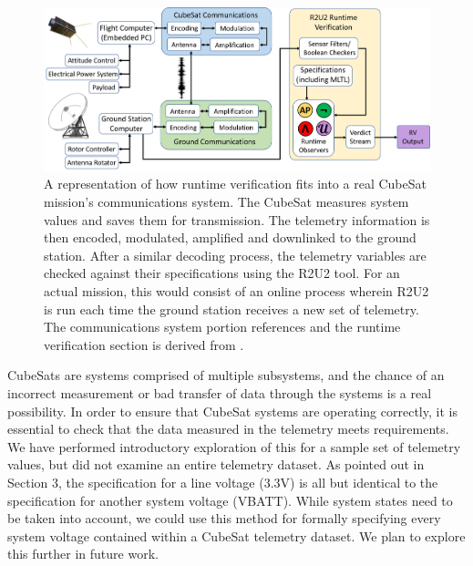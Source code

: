 \documentclass[conf]{new-aiaa}
\begin{document}
\begin{figure}[!ht]
\centering
\includegraphics[width=1\textwidth]{Fig/InFlight_Overview.png}
\caption{A representation of how runtime verification fits into a real CubeSat mission's communications system. The CubeSat measures system values and saves them for transmission. The telemetry information is then encoded, modulated, amplified and downlinked to the ground station. After a similar decoding process, the telemetry variables are checked against their specifications using the R2U2 tool. For an actual mission, this would consist of an online process wherein R2U2 is run each time the ground station receives a new set of telemetry. The communications system portion references \cite{Asundi2013} and the runtime verification section is derived from \cite{ARS17}.}
\label{CubeSatRVDiagram}
\end{figure}

CubeSats are systems comprised of multiple subsystems, and the chance of an incorrect measurement or bad transfer of data through the systems is a real possibility. In order to ensure that CubeSat systems are operating correctly, it is essential to check that the data measured in the telemetry meets requirements. We have performed introductory exploration of this for a sample set of telemetry values, but did not examine an entire telemetry dataset. As pointed out in Section 3, the specification for a line voltage (3.3V) is all but identical to the specification for another system voltage (VBATT). While system states need to be taken into account,%
we could use this method for formally specifying every system voltage contained within a CubeSat telemetry dataset. We plan to explore this further in future work.
\end{document}
